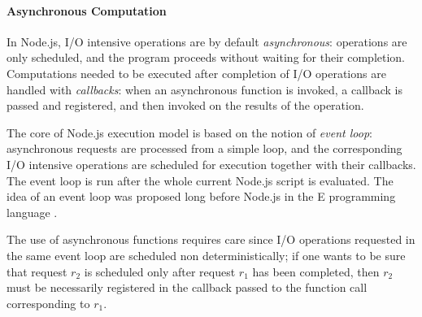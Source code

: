 \paragraph{Asynchronous Computation}
In Node.js, %
I/O intensive operations are by default \emph{asynchronous}: operations are only scheduled, and the program proceeds without waiting for their completion.
Computations needed to be executed after completion of I/O operations are handled with \emph{callbacks}: when an asynchronous function is invoked, a callback is passed and registered, and then invoked on the results of the operation.

The core of Node.js execution model is based on the notion of \emph{event loop}: asynchronous requests are processed from a simple loop,
and the corresponding I/O intensive operations are scheduled for execution together with their callbacks.
The event loop is run after the whole current Node.js script is evaluated.
The idea of an event loop was proposed long before Node.js in the E programming language \cite{eventloop}.

The use of asynchronous functions requires care since I/O operations requested in the same event loop are scheduled non deterministically;
if one wants to be sure that request $r_2$ is scheduled only after request $r_1$ has been completed, then
$r_2$ must be necessarily registered in the callback passed to the function call corresponding to $r_1$.


